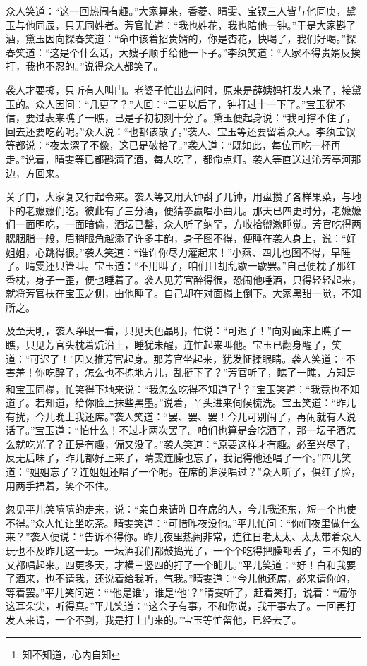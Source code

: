\documentclass[12pt,oneside]{book}
\begin{document}
众人笑道：“这一回热闹有趣。”大家算来，香菱、晴雯、宝钗三人皆与他同庚，黛玉与他同辰，只无同姓者。芳官忙道：“我也姓花，我也陪他一钟。”于是大家斟了酒，黛玉因向探春笑道：“命中该着招贵婿的，你是杏花，快喝了，我们好喝。”探春笑道：“这是个什么话，大嫂子顺手给他一下子。”李纨笑道：“人家不得贵婿反挨打，我也不忍的。”说得众人都笑了。

袭人才要掷，只听有人叫门。老婆子忙出去问时，原来是薛姨妈打发人来了，接黛玉的。众人因问：“几更了？”人回：“二更以后了，钟打过十一下了。”宝玉犹不信，要过表来瞧了一瞧，已是子初初刻十分了。黛玉便起身说：“我可撑不住了，回去还要吃药呢。”众人说：“也都该散了。”袭人、宝玉等还要留着众人。李纨宝钗等都说：“夜太深了不像，这已是破格了。”袭人道：“既如此，每位再吃一杯再走。”说着，晴雯等已都斟满了酒，每人吃了，都命点灯。袭人等直送过沁芳亭河那边，方回来。

关了门，大家复又行起令来。袭人等又用大钟斟了几钟，用盘攒了各样果菜，与地下的老嬷嬷们吃。彼此有了三分酒，便猜拳赢唱小曲儿。那天已四更时分，老嬷嬷们一面明吃，一面暗偷，酒坛已罄，众人听了纳罕，方收拾盥漱睡觉。芳官吃得两腮胭脂一般，眉稍眼角越添了许多丰韵，身子图不得，便睡在袭人身上，说：“好姐姐，心跳得很。”袭人笑道：“谁许你尽力灌起来！”小燕、四儿也图不得，早睡了。晴雯还只管叫。宝玉道：“不用叫了，咱们且胡乱歇一歇罢。”自己便枕了那红香枕，身子一歪，便也睡着了。袭人见芳官醉得很，恐闹他唾酒，只得轻轻起来，就将芳官扶在宝玉之侧，由他睡了。自己却在对面榻上倒下。大家黑甜一觉，不知所之。

及至天明，袭人睁眼一看，只见天色晶明，忙说：“可迟了！”向对面床上瞧了一瞧，只见芳官头枕着炕沿上，睡犹未醒，连忙起来叫他。宝玉已翻身醒了，笑道：“可迟了！”因又推芳官起身。那芳官坐起来，犹发怔揉眼睛。袭人笑道：“不害羞！你吃醉了，怎么也不拣地方儿，乱挺下了？”芳官听了，瞧了一瞧，方知是和宝玉同榻，忙笑得下地来说：“我怎么吃得不知道了\footnote{知不知道，心内自知}？”宝玉笑道：“我竟也不知道了。若知道，给你脸上抹些黑墨。”说着，丫头进来伺候梳洗。宝玉笑道：“昨儿有扰，今儿晚上我还席。”袭人笑道：“罢、罢、罢！今儿可别闹了，再闹就有人说话了。”宝玉道：“怕什么！不过才两次罢了。咱们也算是会吃酒了，那一坛子酒怎么就吃光了？正是有趣，偏又没了。”袭人笑道：“原要这样才有趣。必至兴尽了，反无后味了，昨儿都好上来了，晴雯连臊也忘了，我记得他还唱了一个。”四儿笑道：“姐姐忘了？连姐姐还唱了一个呢。在席的谁没唱过？”众人听了，俱红了脸，用两手捂着，笑个不住。

忽见平儿笑嘻嘻的走来，说：“亲自来请昨日在席的人，今儿我还东，短一个也使不得。”众人忙让坐吃茶。晴雯笑道：“可惜昨夜没他。”平儿忙问：“你们夜里做什么来？”袭人便说：“告诉不得你。昨儿夜里热闹非常，连往日老太太、太太带着众人玩也不及昨儿这一玩。一坛酒我们都鼓捣光了，一个个吃得把臊都丢了，三不知的又都唱起来。四更多天，才横三竖四的打了一个盹儿。”平儿笑道：“好！白和我要了酒来，也不请我，还说着给我听，气我。”晴雯道：“今儿他还席，必来请你的，等着罢。”平儿笑问道：“‘他是谁’，谁是‘他’？”晴雯听了，赶着笑打，说着：“偏你这耳朵尖，听得真。”平儿笑道：“这会子有事，不和你说，我干事去了。一回再打发人来请，一个不到，我是打上门来的。”宝玉等忙留他，已经去了。
\end{document}
